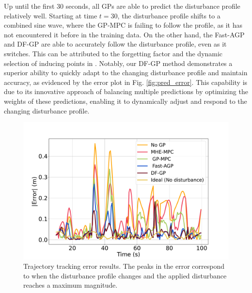  Up until the first 30 seconds, all  \ac{GP}s are able to predict the disturbance profile relatively well. Starting at time $t=30$, the disturbance profile shifts to a combined sine wave, where the GP-MPC \cite{mohit_gp} is failing to follow the profile, as it has not encountered it before in the training data. On the other hand, the Fast-AGP and \ac{DF-GP} are able to accurately follow the disturbance profile, even as it switches. This can be attributed to the forgetting factor and the dynamic selection of inducing points in \cite{asgp}. Notably, our \ac{DF-GP} method demonstrates a superior ability to quickly adapt to the changing disturbance profile and maintain accuracy, as evidenced by the error plot in Fig. \ref{fig:pred_error}. This capability is due to its innovative approach of balancing multiple predictions by optimizing the weights of these predictions, enabling it to dynamically adjust and respond to the changing disturbance profile.








\begin{figure}[t]
	\centering	\includegraphics[width=0.7\linewidth]{figures/traj_err_mhe.pdf}
	\caption{Trajectory tracking error results. The peaks in the error correspond to when the disturbance profile changes and the applied disturbance reaches a maximum magnitude.} %
	\label{fig:traj_error}
\end{figure}








